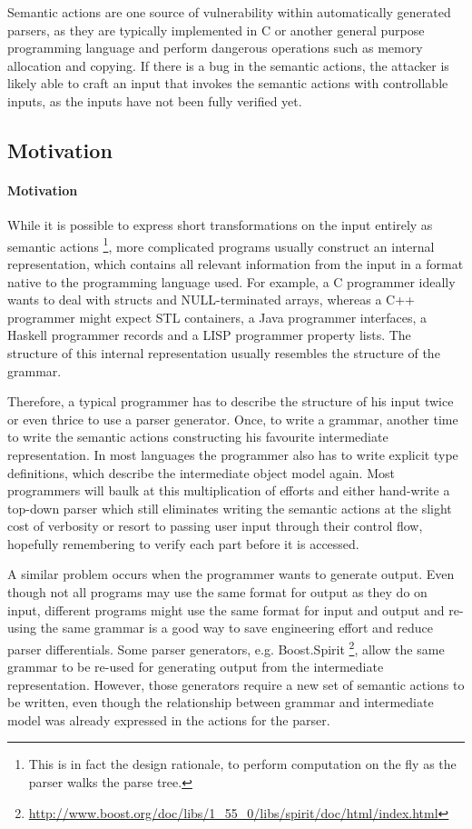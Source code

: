 Semantic actions are one source of vulnerability within automatically generated parsers, as they are
typically implemented in C or another general purpose programming language and perform dangerous
operations such as memory allocation and copying. If there is a bug in the semantic actions, the
attacker is likely able to craft an input that invokes the semantic actions with controllable
inputs, as the inputs have not been fully verified yet.

\subsection{Motivation}
\paragraph{Motivation}
While it is possible to express short transformations on the input entirely as semantic actions
\footnote{This is in fact the design rationale, to perform computation on the fly as the parser
  walks the parse tree.}, more complicated programs usually construct an internal representation,
which contains all relevant information from the input in a format native to the programming
language used. For example, a C programmer ideally wants to deal with structs and NULL-terminated
arrays, whereas a C++ programmer might expect STL containers, a Java programmer interfaces, a
Haskell programmer records and a LISP programmer property lists. 
 The structure of this internal representation usually resembles the structure of the grammar. 

Therefore, a typical programmer has to describe the structure of his input twice or even thrice to
use a parser generator. Once, to write a grammar, another time to write the semantic actions
constructing his favourite intermediate representation. In most languages the programmer also has to
write explicit type definitions, which describe the intermediate object model again. Most
programmers will baulk at this multiplication of efforts and either hand-write a top-down parser
which still eliminates writing the semantic actions at the slight cost of verbosity or resort to
passing user input through their control flow, hopefully remembering to verify each part before
it is accessed. 

A similar problem occurs when the programmer wants to generate output. 
Even though not all programs may use the same format for output as they do on input, different
programs might use the same format for input and output and re-using the same grammar is a good way
to save engineering effort and reduce parser differentials.
Some parser generators, e.g.
Boost.Spirit \footnote{\url{http://www.boost.org/doc/libs/1_55_0/libs/spirit/doc/html/index.html}},
allow the same grammar to be re-used for generating output from the intermediate representation.
However, those generators require a new set of semantic actions to be written, even though the
relationship between grammar and intermediate model was already expressed in the actions for the
parser.

